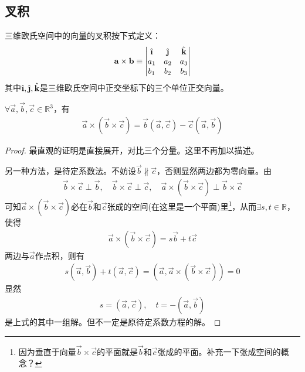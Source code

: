 \begin{definition}
  
\end{definition}


\subsection{叉积}
\label{sec:cross-product-of-vector}
\begin{definition}
  三维欧氏空间中的向量的叉积按下式定义：
  \begin{align*}
    \vec{a}\times\vec{b}\equiv
    \begin{vmatrix}
      \ihat  & \jhat  & \khat\\
      a_1    & a_2    & a_3\\
      b_1    & b_2    & b_3
    \end{vmatrix}
  \end{align*}
  其中$\ihat, \jhat, \khat$是三维欧氏空间中正交坐标下的三个单位正交向量。
\end{definition}

\begin{lemma}
  $\forall \vec a,\vec b,\vec c\in\mathbb{R}^3$，有
  \begin{align*}
    \vec a\times(\vec b\times \vec c)=\vec b(\vec a,\vec c) - \vec c(\vec a,\vec b)
  \end{align*}
\end{lemma}
\begin{proof}
  最直观的证明是直接展开，对比三个分量。这里不再加以描述。

  另一种方法，是待定系数法。不妨设$\vec b\not\parallel\vec c$，否则显然两边都为零向量。由
  \begin{align*}
    \vec b\times\vec c\perp \vec b,\quad \vec b\times\vec c\perp \vec c,\quad
    \vec a\times(\vec b\times\vec c)\perp \vec b\times \vec c
  \end{align*}
  可知$\vec a\times(\vec b\times\vec c)$必在$\vec b$和$\vec c$张成的空间(在这里是一个平面)里\footnote{因为垂直于向量$\vec b\times\vec c$的平面就是$\vec b$和$\vec c$张成的平面。\color{red}补充一下张成空间的概念？}，从而$\exists s,t\in\mathbb{R}$，使得
  \begin{align*}
    \vec a\times(\vec b\times\vec c) = s\vec b +t\vec c
  \end{align*}
  两边与$\vec a$作点积，则有
  \begin{align*}
    s(\vec a,\vec b)+t(\vec a,\vec c)=(\vec a, \vec a\times(\vec b\times\vec c))=0
  \end{align*}
  显然
  \begin{align*}
    s=(\vec a,\vec c),\quad
    t=-(\vec a,\vec b)
  \end{align*}
  是上式的其中一组解。\color{red}但不一定是原待定系数方程的解。
\end{proof}

